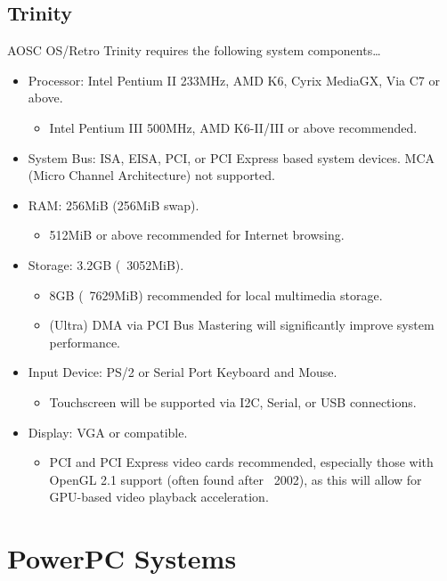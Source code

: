     \subsection{Trinity}

    AOSC OS/Retro Trinity requires the following system components\ldots

    \begin{itemize}
    \item Processor: Intel Pentium II 233MHz, AMD K6, Cyrix MediaGX, Via C7 or above.
        \begin{itemize}
        \item Intel Pentium III 500MHz, AMD K6-II/III or above recommended.
        \end{itemize}
    \item System Bus: ISA, EISA, PCI, or PCI Express based system devices. MCA (Micro Channel Architecture) not supported.
    \item RAM: 256MiB (256MiB swap).
        \begin{itemize}
        \item 512MiB or above recommended for Internet browsing.
        \end{itemize}
    \item Storage: 3.2GB (~3052MiB).
        \begin{itemize}
        \item 8GB (~7629MiB) recommended for local multimedia storage.
        \item (Ultra) DMA via PCI Bus Mastering will significantly improve system performance.
        \end{itemize}
    \item Input Device: PS/2 or Serial Port Keyboard and Mouse.
        \begin{itemize}
        \item Touchscreen will be supported via I2C, Serial, or USB connections.
        \end{itemize}
    \item Display: VGA or compatible.
        \begin{itemize}
        \item PCI and PCI Express video cards recommended, especially those with OpenGL 2.1 support (often found after ~2002), as this will allow for GPU-based video playback acceleration.
        \end{itemize}
    \end{itemize}


    \section{PowerPC Systems}

